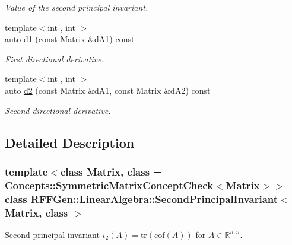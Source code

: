 \begin{DoxyCompactItemize}
\begin{DoxyCompactList}\small\item\em Value of the second principal invariant. \end{DoxyCompactList}\item 
{\footnotesize template$<$int , int $>$ }\\auto \hyperlink{classRFFGen_1_1LinearAlgebra_1_1SecondPrincipalInvariant_a411b252232f2d2a4332f5f22fab5e805}{d1} (const Matrix \&d\-A1) const 
\begin{DoxyCompactList}\small\item\em First directional derivative. \end{DoxyCompactList}\item 
{\footnotesize template$<$int , int $>$ }\\auto \hyperlink{classRFFGen_1_1LinearAlgebra_1_1SecondPrincipalInvariant_a8814f8f93d1f6fa547ff32e95669aa93}{d2} (const Matrix \&d\-A1, const Matrix \&d\-A2) const 
\begin{DoxyCompactList}\small\item\em Second directional derivative. \end{DoxyCompactList}\end{DoxyCompactItemize}


\subsection{Detailed Description}
\subsubsection*{template$<$class Matrix, class = Concepts\-::\-Symmetric\-Matrix\-Concept\-Check$<$\-Matrix$>$$>$class R\-F\-F\-Gen\-::\-Linear\-Algebra\-::\-Second\-Principal\-Invariant$<$ Matrix, class $>$}

Second principal invariant $ \iota_2(A)=\mathrm{tr}(\mathrm{cof}(A)) $ for $A\in\mathbb{R}^{n,n}$. 

